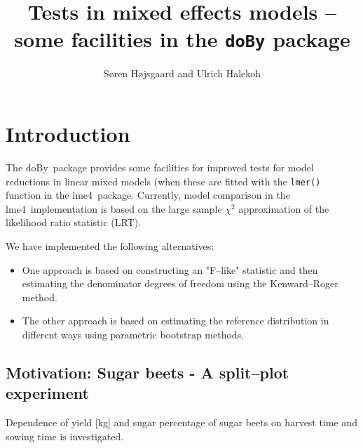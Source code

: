 \documentclass[12pt]{article}
\title{Tests in mixed effects models -- some facilities in the
  \texttt{doBy} package}
\author{S{\o}ren H{\o}jsgaard and Ulrich Halekoh}
\begin{document}
\maketitle
\tableofcontents


\renewenvironment{Schunk}{\begin{center}
    \scriptsize
    \begin{boxedminipage}{1.0\textwidth}}{
    \end{boxedminipage}\end{center}}


\def\proglang#1{{#1}}
\def\pkg#1{{#1}}
\def\doby{\pkg{doBy}}
\def\lme{\pkg{lme4}}
\def\code#1{\texttt{#1}}
\def\shd#1{\footnote{SHD: #1}}
\def\summaryby{\code{summaryBy}}
\def\R{\proglang{R}}


\parindent0pt\parskip5pt




\section{Introduction}
\label{sec:introduction}

The \doby\ package provides some facilities for improved tests for
model reductions in linear mixed models (when these are fitted with
the \code{lmer()} function in the \lme\ package. Currently, model
comparison in the \lme\ implementation is based on the large sample
$\chi^2$ approximation of the likelihood ratio statistic (LRT).

We have implemented the following alternatives:

\begin{itemize}
\item
One approach is based on constructing an "F--like" statistic and then
estimating the denominator degrees of freedom using the Kenward--Roger method.

\item The other approach is based on estimating the reference
  distribution in different ways using parametric bootstrap methods.

\end{itemize}

\subsection{Motivation: Sugar beets - A split--plot experiment}
\label{sec:xxx}


  Dependence of yield [kg] and sugar percentage of sugar beets on
  harvest time and sowing time is investigated.
\end{document}
